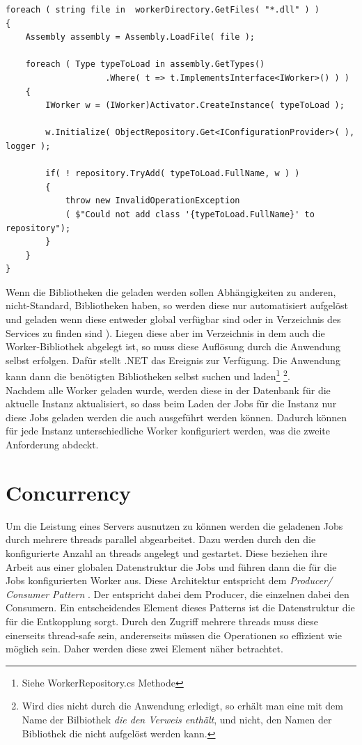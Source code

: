 \begin{lstlisting}[caption={Dynamic Loading, siehe WorkerRepository.cs - LoadAllWorkers()},label={lst:dynamicloading},captionpos=b]
foreach ( string file in  workerDirectory.GetFiles( "*.dll" ) )
{
	Assembly assembly = Assembly.LoadFile( file );

	foreach ( Type typeToLoad in assembly.GetTypes()
					.Where( t => t.ImplementsInterface<IWorker>() ) )
	{
		IWorker w = (IWorker)Activator.CreateInstance( typeToLoad );

		w.Initialize( ObjectRepository.Get<IConfigurationProvider>( ), logger );

		if( ! repository.TryAdd( typeToLoad.FullName, w ) )
		{
			throw new InvalidOperationException
			( $"Could not add class '{typeToLoad.FullName}' to repository");
		}
	}
}
\end{lstlisting}
Wenn die Bibliotheken die geladen werden sollen Abhängigkeiten zu anderen, nicht-Standard, Bibliotheken haben, so werden diese nur automatisiert aufgelöst und geladen wenn diese entweder global verfügbar sind oder in Verzeichnis des Services zu finden sind \parencite[S. 42ff]{box}). Liegen diese aber im Verzeichnis in dem auch die Worker-Bibliothek abgelegt ist, so muss diese Auflösung durch die Anwendung selbst erfolgen. Dafür stellt .NET das Ereignis  zur Verfügung. Die Anwendung kann dann die benötigten Bibliotheken selbst suchen und laden\footnote{Siehe WorkerRepository.cs Methode } \footnote{Wird dies nicht durch die Anwendung erledigt, so erhält man eine  mit dem Name der Bilbiothek \emph{die den Verweis enthält}, und nicht, den Namen der Bibliothek die nicht aufgelöst werden kann. }.
\\Nachdem alle Worker geladen wurde, werden diese in der Datenbank für die aktuelle Instanz aktualisiert, so dass beim Laden der Jobs für die Instanz nur diese Jobs geladen werden die auch ausgeführt werden können. Dadurch können für jede Instanz unterschiedliche Worker konfiguriert werden, was die zweite Anforderung abdeckt.
\section{Concurrency}
Um die Leistung eines Servers ausnutzen zu können werden die geladenen Jobs durch mehrere threads parallel abgearbeitet. Dazu werden durch den  die konfigurierte Anzahl an threads angelegt und gestartet. Diese beziehen ihre Arbeit aus einer globalen Datenstruktur die Jobs und führen dann die für die Jobs konfigurierten Worker aus. Diese Architektur entspricht dem \emph{Producer/ Consumer Pattern} \parencite[S. 163ff]{jthreads}. Der  entspricht dabei dem Producer, die einzelnen  dabei den Consumern. Ein entscheidendes Element dieses Patterns ist die Datenstruktur die für die Entkopplung sorgt. Durch den Zugriff mehrere threads muss diese einerseits thread-safe sein, andererseits müssen die Operationen so effizient wie möglich sein. Daher werden diese zwei Element näher betrachtet.
